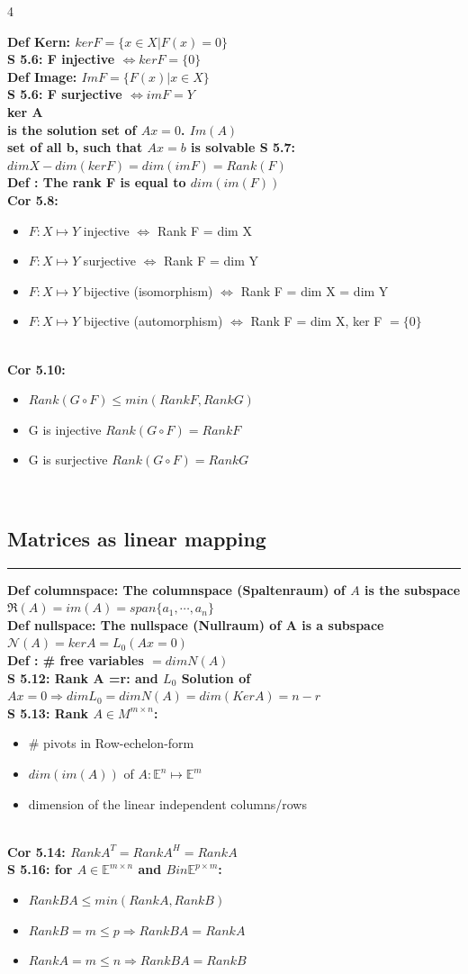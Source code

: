 \documentclass[7pt,landscape, margin = 0.1mm]{article}
\newcommand*{\mysubsection}[1]{\vspace{-2mm}\color{chaptercolor}\subsection{ #1 }
\vspace{-1mm}\hrule\vspace{1.5mm}\color{black}
\vspace{2mm}}
\newcommand{\COL}[1]{ \color{chaptercolor} \bf{#1}\color{black}     \\}
\newcommand{\DEF}[2]{\color{chaptercolor}\bf{Def #1}:\color{black}    \hspace{0.2cm} #2 \\}
\newcommand{\COR}[2]{\color{chaptercolor}\bf{Cor #1}:\color{black}    \hspace{0.2cm} #2 \\}
\newcommand{\SA}[2]{\color{chaptercolor}\bf{S #1}:\color{black}    \hspace{0.2cm} #2 \\}
\begin{document}
\begin{multicols}{4}
\begin{flushleft}
\DEF{Kern}{ $ ker F = \{ x \in X | F(x)=0 \}$}
\SA{5.6}{F injective $\Leftrightarrow ker F = \{0\} $}
\DEF{Image}{ $ Im F = \{ F(x) | x \in X \}$}
\SA{5.6}{F surjective $\Leftrightarrow im F = Y $}
\COL{ker A} is the solution set of $Ax=0$. \COL{$Im (A)$} set of all b, such that $Ax=b$ is solvable
\SA{5.7}{$dim X - dim (ker F) = dim (im F) = Rank(F) $}
\DEF{}{The rank F is equal to $dim(im (F))$}
\COR{5.8}{
\begin{itemize}
\item $F: X \mapsto Y $ injective $\Leftrightarrow $ Rank F = dim X
\item $F: X \mapsto Y $ surjective $\Leftrightarrow $ Rank F = dim Y
\item $F: X \mapsto Y $ bijective (isomorphism) $\Leftrightarrow $ Rank F = dim X = dim Y

\item $F: X \mapsto Y $ bijective (automorphism) $\Leftrightarrow $ Rank F = dim X, ker F $= \{0\}$
\end{itemize}

}
\COR{5.10}{\begin{itemize}
\item $Rank (G \circ F) \leq min(Rank F, Rank G)$
\item G is injective $Rank (G \circ F) = Rank F $
\item G is surjective $Rank (G \circ F) = Rank G $
\end{itemize}}
\mysubsection{\centering Matrices as linear mapping}
\DEF{columnspace}{ The columnspace (Spaltenraum) of $A$ is the subspace $\Re(A)= im(A)= span \{ a_1 , \cdots , a_n \} $}

\DEF{nullspace}{The nullspace (Nullraum) of A is a subspace $ \mathcal{N}(A) = ker A = L_0(Ax=0)$}

\DEF{}{\# free variables $=dim N(A) $}
\SA{5.12}{Rank A =r: and $L_0$ Solution of $Ax=0 \Rightarrow dim L_0 = dim N(A) = dim(Ker A)= n-r$}
\SA{5.13}{Rank $A \in M^{m \times n}$: 
\begin{itemize}
\item # pivots in Row-echelon-form
\item $dim(im (A))$ of $A: \mathbb{E}^n \mapsto \mathbb{E}^m $
\item dimension of the linear independent columns/rows
\end{itemize}}
\COR{5.14}{$Rank A^T= Rank A^H = Rank A$}
\SA{5.16}{for $A \in \mathbb{E}^{m \times n} $ and $B in  \mathbb{E}^{p \times m} $:
\begin{itemize}
\item $Rank BA \leq min (Rank A,Rank B)$
\item $Rank B  = m \leq p \Rightarrow Rank BA = Rank A$
\item $Rank A = m \leq n \Rightarrow Rank BA = Rank B$
\end{itemize}

}
\end{flushleft}
\end{multicols}
\end{document}
